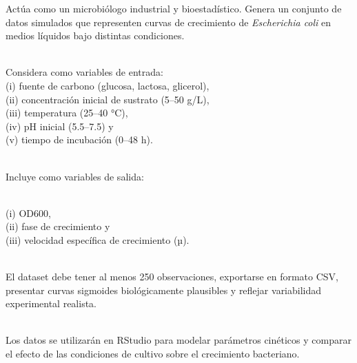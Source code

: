 \documentclass[
  spanish,
  letterpaper,
  DIV=11,
  numbers=noendperiod]{scrreprt}
\begin{document}
\begin{tcolorbox}[enhanced jigsaw, colback=white, breakable, toptitle=1mm, toprule=.15mm, colbacktitle=quarto-callout-tip-color!10!white, bottomrule=.15mm, coltitle=black, titlerule=0mm, opacityback=0, leftrule=.75mm, bottomtitle=1mm, colframe=quarto-callout-tip-color-frame, left=2mm, title=\textcolor{quarto-callout-tip-color}{\faLightbulb}\hspace{0.5em}{Tercer modelo de Prompt}, rightrule=.15mm, opacitybacktitle=0.6, arc=.35mm]

Actúa como un microbiólogo industrial y bioestadístico. Genera un
conjunto de datos simulados que representen curvas de crecimiento de
\emph{Escherichia coli} en medios líquidos bajo distintas condiciones.\\
\strut \\
Considera como variables de entrada:\\
(i) fuente de carbono (glucosa, lactosa, glicerol),\\
(ii) concentración inicial de sustrato (5--50 g/L),\\
(iii) temperatura (25--40 °C),\\
(iv) pH inicial (5.5--7.5) y\\
(v) tiempo de incubación (0--48 h).\\
\strut \\
Incluye como variables de salida:\\
\strut \\
(i) OD600,\\
(ii) fase de crecimiento y\\
(iii) velocidad específica de crecimiento (µ).\\
\strut \\
El dataset debe tener al menos 250 observaciones, exportarse en formato
CSV, presentar curvas sigmoides biológicamente plausibles y reflejar
variabilidad experimental realista.\\
\strut \\
Los datos se utilizarán en RStudio para modelar parámetros cinéticos y
comparar el efecto de las condiciones de cultivo sobre el crecimiento
bacteriano.

\end{tcolorbox}
\end{document}
